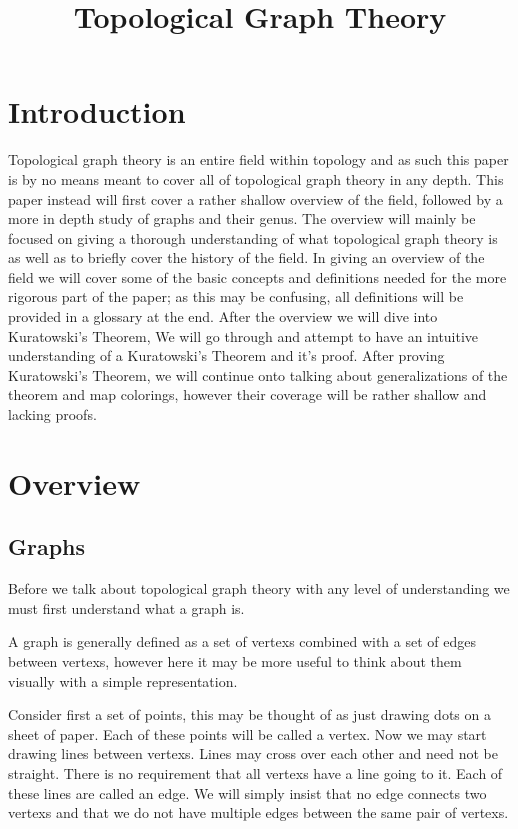 \documentclass{article}
\title{Topological Graph Theory}
\begin{document}
\maketitle
\tableofcontents



\section{Introduction}
Topological graph theory is an entire field within topology and as such this paper is by no means meant to cover all of topological graph theory in any depth. This paper instead will first cover a rather shallow overview of the field, followed by a more in depth study of graphs and their genus. The overview will mainly be focused on giving a thorough understanding of what topological graph theory is as well as to briefly cover the history of the field. In giving an overview of the field we will cover some of the basic concepts and definitions needed for the more rigorous part of the paper; as this may be confusing, all definitions will be provided in a glossary at the end. After the overview we will dive into Kuratowski's Theorem, We will go through and attempt to have an intuitive understanding of a Kuratowski's Theorem and it's proof. After proving Kuratowski's Theorem, we will continue onto talking about generalizations of the theorem and map colorings, however their coverage will be rather shallow and lacking proofs.

\section{Overview}
\subsection{Graphs}
Before we talk about topological graph theory with any level of understanding we must first understand what a \gls{graph} is.

A \gls{graph} is generally defined as a \gls{set} of \glspl{vertex} combined with a \gls{set} of \glspl{edge} between \glspl{vertex}, however here it may be more useful to think about them visually with a simple representation.

Consider first a \gls{set} of points, this may be thought of as just drawing dots on a sheet of paper. Each of these points will be called a \gls{vertex}. Now we may start drawing lines between \glspl{vertex}. Lines may cross over each other and need not be straight. There is no requirement that all \glspl{vertex} have a line going to it. Each of these lines are called an \gls{edge}. We will simply insist that no \gls{edge} connects two \glspl{vertex} and that we do not have multiple \glspl{edge} between the same pair of \glspl{vertex}.
\end{document}
